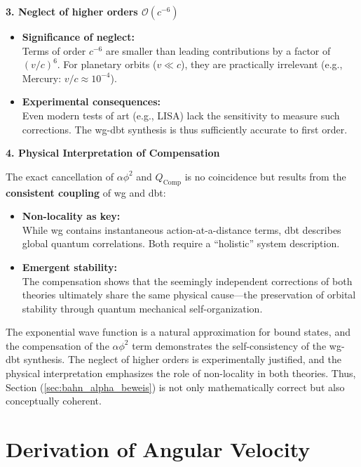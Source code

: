 \textbf{3. Neglect of higher orders $\mathcal{O}(c^{-6})$}

\begin{itemize}
    \item \textbf{Significance of neglect:}\\Terms of order $c^{-6}$ are smaller than leading contributions by a factor of $(v/c)^{6}$. For planetary orbits ($v \ll c$), they are practically irrelevant (e.g., Mercury: $v/c \approx 10^{-4}$).
    \item \textbf{Experimental consequences:}\\Even modern tests of \gls{art} (e.g., LISA) lack the sensitivity to measure such corrections. The \gls{wg}-\gls{dbt} synthesis is thus sufficiently accurate to first order.
\end{itemize}

\textbf{4. Physical Interpretation of Compensation}

The exact cancellation of $\alpha \phi^{2}$ and $Q_\text{Comp}$ is no coincidence but results from the \textbf{consistent coupling} of \gls{wg} and \gls{dbt}:
\begin{itemize}
    \item \textbf{Non-locality as key:}\\While \gls{wg} contains instantaneous action-at-a-distance terms, \gls{dbt} describes global quantum correlations. Both require a \enquote{holistic} system description.
    \item \textbf{Emergent stability:}\\The compensation shows that the seemingly independent corrections of both theories ultimately share the same physical cause—the preservation of orbital stability through quantum mechanical self-organization.
\end{itemize}

The exponential wave function is a natural approximation for bound states, and the compensation of the $\alpha \phi^{2}$ term demonstrates the self-consistency of the \gls{wg}-\gls{dbt} synthesis.
The neglect of higher orders is experimentally justified, and the physical interpretation emphasizes the role of non-locality in both theories. Thus,
Section (\ref{sec:bahn_alpha_beweis}) is not only mathematically correct but also conceptually coherent.

\section{Derivation of Angular Velocity}
\label{sec:angular_velocity}

